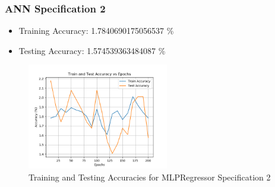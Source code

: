 \documentclass[12pt]{article}
\begin{document}
\subsubsection{ANN Specification 2}
\begin{itemize}
	\item Training Accuracy: 1.7840690175056537 \%
	\item Testing Accuracy: 1.574539363484087 \%
\end{itemize}
\begin{figure}[H]
	\centering
	\includegraphics[width=0.55\textwidth]{scikit_learn_model_4_accuracy_comparison.png}
	\caption{Training and Testing Accuracies for MLPRegressor Specification 2}
	\label{fig:mlpr2}
\end{figure}
\end{document}
